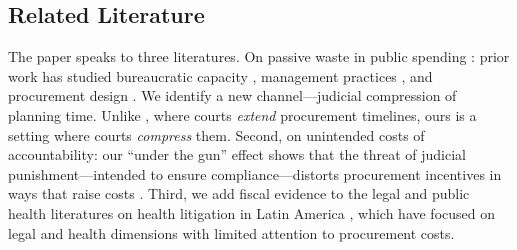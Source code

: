 \subsection*{Related Literature}

The paper speaks to three literatures. On passive waste in public spending \citep{bandiera2009active}: prior work has studied bureaucratic capacity \citep{best2023procurement}, management practices \citep{rasul2018management}, and procurement design \citep{lewisfaupel2016can, coviello2018bidding, decarolis2018buyer, baltrunaite2021discretion, szucs2024discretion}. We identify a new channel---judicial compression of planning time. Unlike \citet{coviello2018bidding}, where courts \emph{extend} procurement timelines, ours is a setting where courts \emph{compress} them. Second, on unintended costs of accountability: our ``under the gun'' effect shows that the threat of judicial punishment---intended to ensure compliance---distorts procurement incentives in ways that raise costs \citep{duflo2018obligations, williams2021bureaucratic}. Third, we add fiscal evidence to the legal and public health literatures on health litigation in Latin America \citep{wang2015right, ferraz2009right, biehl2009will}, which have focused on legal and health dimensions with limited attention to procurement costs.
